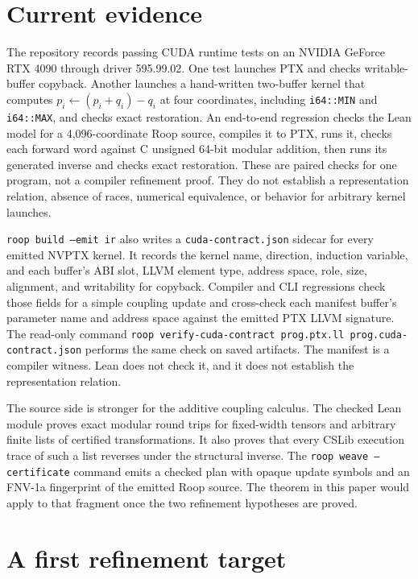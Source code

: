 \documentclass[aop,preprint]{../aop-template/imsart}
\theoremstyle{definition}
\begin{document}
\section{Current evidence}

The repository records passing CUDA runtime tests on an NVIDIA GeForce RTX 4090 through driver 595.99.02. One test launches PTX and checks writable-buffer copyback. Another launches a hand-written two-buffer kernel that computes $p_i\leftarrow(p_i+q_i)-q_i$ at four coordinates, including \texttt{i64::MIN} and \texttt{i64::MAX}, and checks exact restoration. An end-to-end regression checks the Lean model for a 4,096-coordinate Roop source, compiles it to PTX, runs it, checks each forward word against C unsigned 64-bit modular addition, then runs its generated inverse and checks exact restoration. These are paired checks for one program, not a compiler refinement proof. They do not establish a representation relation, absence of races, numerical equivalence, or behavior for arbitrary kernel launches.

\texttt{roop build --emit ir} also writes a \texttt{cuda-contract.json} sidecar for every emitted NVPTX kernel. It records the kernel name, direction, induction variable, and each buffer's ABI slot, LLVM element type, address space, role, size, alignment, and writability for copyback. Compiler and CLI regressions check those fields for a simple coupling update and cross-check each manifest buffer's parameter name and address space against the emitted PTX LLVM signature. The read-only command \texttt{roop verify-cuda-contract prog.ptx.ll prog.cuda-contract.json} performs the same check on saved artifacts. The manifest is a compiler witness. Lean does not check it, and it does not establish the representation relation.

The source side is stronger for the additive coupling calculus. The checked Lean module proves exact modular round trips for fixed-width tensors and arbitrary finite lists of certified transformations. It also proves that every CSLib execution trace of such a list reverses under the structural inverse. The \texttt{roop weave --certificate} command emits a checked plan with opaque update symbols and an FNV-1a fingerprint of the emitted Roop source. The theorem in this paper would apply to that fragment once the two refinement hypotheses are proved.

\section{A first refinement target}
\end{document}
